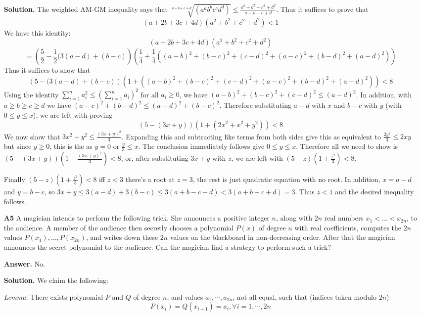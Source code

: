 \documentclass[11pt,a4paper]{article}
\begin{document}
\begin{enumerate}
	\textbf{Solution.} The weighted AM-GM inequality says that $\sqrt[a+b+c+d]{(a^ab^bc^cd^d)}\le \frac{a^2+b^2+c^2+d^2}{a+b+c+d}$. Thus it suffices to prove that 
	\[(a+2b+3c+4d)(a^2+b^2+c^2+d^2)<1\]
	We have this identity: 
	\[
	(a+2b+3c+4d)(a^2+b^2+c^2+d^2)
	\]\[
	=
	\left(\frac{5}{2}-\frac{1}{2}(3(a-d)+(b-c)\right)\left(\frac{1}{4}+\frac{1}{4}((a-b)^2+(b-c)^2+(c-d)^2+(a-c)^2+(b-d)^2+(a-d)^2)\right)
	\]
	Thus it suffices to show that 
	$$
	\left(5-(3(a-d)+(b-c)\right)\left(1+((a-b)^2+(b-c)^2+(c-d)^2+(a-c)^2+(b-d)^2+(a-d)^2)\right)< 8
	$$
	Using the identity $\displaystyle\sum_{i=1}^n a_i^2\le (\displaystyle\sum_{i=1}^n a_i)^2$ for all $a_i\ge 0$, we have $(a-b)^2+(b-c)^2+(c-d)^2\le (a-d)^2$.
	In addition, with $a\ge b\ge c\ge d$ we have $(a-c)^2+(b-d)^2\le (a-d)^2+(b-c)^2$.
	Therefore substituting $a-d$ with $x$ and $b-c$ with $y$ (with $0\le y\le x$), we are left with proving
	$$
	\left(5-(3x+y)\right)\left(1+(2x^2+x^2+y^2)\right)< 8
	$$
	We now show that $3x^2+y^2\le \frac{(3x+y)^2}{3}$. Expanding this and subtracting like terms from both sides give this as equivalent to $\frac{2y^2}{3}\le 2xy$ but since $y\ge 0$, this is the as $y=0$ or $\frac{y}{3}\le x$. The conclusion immediately follows give $0\le y\le x$.
	Therefore all we need to show is
	$\left(5-(3x+y)\right)\left(1+\frac{(3x+y)^2}{3}\right)< 8$, or, after substituting $3x+y$ with $z$, we are left with
	$(5-z)(1+\frac{z^2}{3})<8$.
	
	Finally $(5-z)(1+\frac{z^2}{3})<8$ iff $z<3$ there's a root at $z=3$, the rest is just quadratic equation with no root. In addition, $x=a-d$ and $y=b-c$, so $3x+y\le 3(a-d)+3(b-c)\le 3(a+b-c-d)<3(a+b+c+d)=3$. Thus $z<1$ and the desired inequality follows.
	
	\item[\textbf{A5}]
	A magician intends to perform the following trick. She announces a positive integer $n$, along with $2n$ real numbers $x_1 < \dots < x_{2n}$, to the audience. A member of the audience then secretly chooses a polynomial $P(x)$ of degree $n$ with real coefficients, computes the $2n$ values $P(x_1), \dots , P(x_{2n})$, and writes down these $2n$ values on the blackboard in non-decreasing order. After that the magician announces the secret polynomial to the audience. Can the magician find a strategy to perform such a trick?
	
	\textbf{Answer.} No. 
	
	\textbf{Solution.} 
	We claim the following: 
	
	\emph{Lemma.} 
	There exists polynomial $P$ and $Q$ of degree $n$, and values $a_1, \cdots, a_{2n}$, not all equal, such that (indices taken modulo $2n$)
	\[
	P(x_i)=Q(x_{i+1})=a_i, \forall i=1,\cdots, 2n
	\]
	

\end{enumerate}
\end{document}
